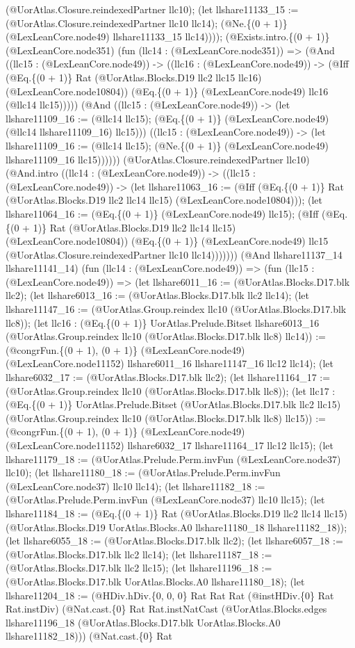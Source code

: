 \documentclass[11pt]{article}
\begin{document}
(@UorAtlas.Closure.reindexedPartner llc10); (let llshare11133\_15 := (@UorAtlas.Closure.reindexedPartner llc10 llc14); (@Ne.\{(0 + 1)\} (@LexLeanCore.node49) llshare11133\_15 llc14)))); (@Exists.intro.\{(0 + 1)\} (@LexLeanCore.node351) (fun (llc14 : (@LexLeanCore.node351)) => (@And ((llc15 : (@LexLeanCore.node49)) -> ((llc16 : (@LexLeanCore.node49)) -> (@Iff (@Eq.\{(0 + 1)\} Rat (@UorAtlas.Blocks.D19 llc2 llc15 llc16) (@LexLeanCore.node10804)) (@Eq.\{(0 + 1)\} (@LexLeanCore.node49) llc16 (@llc14 llc15))))) (@And ((llc15 : (@LexLeanCore.node49)) -> (let llshare11109\_16 := (@llc14 llc15); (@Eq.\{(0 + 1)\} (@LexLeanCore.node49) (@llc14 llshare11109\_16) llc15))) ((llc15 : (@LexLeanCore.node49)) -> (let llshare11109\_16 := (@llc14 llc15); (@Ne.\{(0 + 1)\} (@LexLeanCore.node49) llshare11109\_16 llc15)))))) (@UorAtlas.Closure.reindexedPartner llc10) (@And.intro ((llc14 : (@LexLeanCore.node49)) -> ((llc15 : (@LexLeanCore.node49)) -> (let llshare11063\_16 := (@Iff (@Eq.\{(0 + 1)\} Rat (@UorAtlas.Blocks.D19 llc2 llc14 llc15) (@LexLeanCore.node10804))); (let llshare11064\_16 := (@Eq.\{(0 + 1)\} (@LexLeanCore.node49) llc15); (@Iff (@Eq.\{(0 + 1)\} Rat (@UorAtlas.Blocks.D19 llc2 llc14 llc15) (@LexLeanCore.node10804)) (@Eq.\{(0 + 1)\} (@LexLeanCore.node49) llc15 (@UorAtlas.Closure.reindexedPartner llc10 llc14))))))) (@And llshare11137\_14 llshare11141\_14) (fun (llc14 : (@LexLeanCore.node49)) => (fun (llc15 : (@LexLeanCore.node49)) => (let llshare6011\_16 := (@UorAtlas.Blocks.D17.blk llc2); (let llshare6013\_16 := (@UorAtlas.Blocks.D17.blk llc2 llc14); (let llshare11147\_16 := (@UorAtlas.Group.reindex llc10 (@UorAtlas.Blocks.D17.blk llc8)); (let llc16 : (@Eq.\{(0 + 1)\} UorAtlas.Prelude.Bitset llshare6013\_16 (@UorAtlas.Group.reindex llc10 (@UorAtlas.Blocks.D17.blk llc8) llc14)) := (@congrFun.\{(0 + 1), (0 + 1)\} (@LexLeanCore.node49) (@LexLeanCore.node11152) llshare6011\_16 llshare11147\_16 llc12 llc14); (let llshare6032\_17 := (@UorAtlas.Blocks.D17.blk llc2); (let llshare11164\_17 := (@UorAtlas.Group.reindex llc10 (@UorAtlas.Blocks.D17.blk llc8)); (let llc17 : (@Eq.\{(0 + 1)\} UorAtlas.Prelude.Bitset (@UorAtlas.Blocks.D17.blk llc2 llc15) (@UorAtlas.Group.reindex llc10 (@UorAtlas.Blocks.D17.blk llc8) llc15)) := (@congrFun.\{(0 + 1), (0 + 1)\} (@LexLeanCore.node49) (@LexLeanCore.node11152) llshare6032\_17 llshare11164\_17 llc12 llc15); (let llshare11179\_18 := (@UorAtlas.Prelude.Perm.invFun (@LexLeanCore.node37) llc10); (let llshare11180\_18 := (@UorAtlas.Prelude.Perm.invFun (@LexLeanCore.node37) llc10 llc14); (let llshare11182\_18 := (@UorAtlas.Prelude.Perm.invFun (@LexLeanCore.node37) llc10 llc15); (let llshare11184\_18 := (@Eq.\{(0 + 1)\} Rat (@UorAtlas.Blocks.D19 llc2 llc14 llc15) (@UorAtlas.Blocks.D19 UorAtlas.Blocks.A0 llshare11180\_18 llshare11182\_18)); (let llshare6055\_18 := (@UorAtlas.Blocks.D17.blk llc2); (let llshare6057\_18 := (@UorAtlas.Blocks.D17.blk llc2 llc14); (let llshare11187\_18 := (@UorAtlas.Blocks.D17.blk llc2 llc15); (let llshare11196\_18 := (@UorAtlas.Blocks.D17.blk UorAtlas.Blocks.A0 llshare11180\_18); (let llshare11204\_18 := (@HDiv.hDiv.\{0, 0, 0\} Rat Rat Rat (@instHDiv.\{0\} Rat Rat.instDiv) (@Nat.cast.\{0\} Rat Rat.instNatCast (@UorAtlas.Blocks.edges llshare11196\_18 (@UorAtlas.Blocks.D17.blk UorAtlas.Blocks.A0 llshare11182\_18))) (@Nat.cast.\{0\} Rat 
\end{document}
